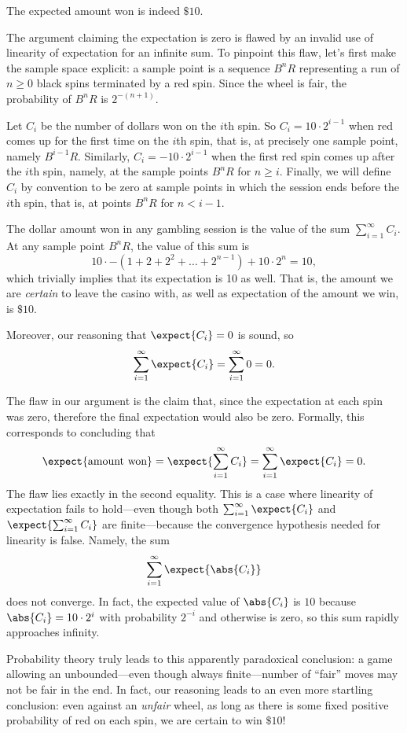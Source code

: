 \begin{editingnotes}
The expected amount won is indeed $\$10$.

The argument claiming the expectation is zero is flawed by an invalid use
of linearity of expectation for an infinite sum.  To pinpoint this flaw,
let's first make the sample space explicit: a sample point is a sequence
$B^nR$ representing a run of $n \geq 0$ black spins terminated by a red
spin.  Since the wheel is fair, the probability of $B^nR$ is $2^{-(n+1)}$.

Let $C_i$ be the number of dollars won on the $i$th spin.  So
$C_i = 10 \cdot 2^{i-1}$
when red comes up for the first time on the $i$th spin, that is, at
precisely one sample point, namely $B^{i-1}R$.  Similarly,
$C_i = -10  \cdot  2^{i-1}$
when the first red spin comes up after the $i$th spin, namely, at the
sample points $B^nR$ for $n \geq i$.  Finally, we will define $C_i$ by
convention to be zero at sample points in which the session ends before the
$i$th spin, that is, at points $B^nR$ for $n < i-1$.

The dollar amount won in any gambling session is the value of the sum
$\sum_{i = 1}^\infty C_i$.  At any sample point $B^nR$, the value of this
sum is
\[
10 \cdot -(1 + 2 + 2^2 + \dots + 2^{n - 1}) + 10 \cdot 2^n  = 10,
\]
which trivially implies that its expectation is 10 as well.  That is, the
amount we are \emph{certain} to leave the casino with, as well as
expectation of the amount we win, is $\$10$.

Moreover, our reasoning that $\expect{C_i} = 0$ is sound, so
\[
\sum_{i = 1}^\infty \expect{C_i} = \sum_{i = 1}^\infty 0 = 0.
\]

The flaw in our argument is the claim that, since the expectation at each
spin was zero, therefore the final expectation would also be zero.
Formally, this corresponds to concluding that
\[
\expect{\mbox{amount won}}  =  \expect{\sum_{i = 1}^\infty C_i}
  =  \sum_{i = 1}^\infty \expect{C_i} = 0.
\]
The flaw lies exactly in the second equality.  This is a case where
linearity of expectation fails to hold---even though both $\sum_{i =
1}^\infty \expect{C_i}$ and $\expect{\sum_{i = 1}^\infty C_i}$ are
finite---because the convergence hypothesis needed for linearity is false.
Namely, the sum
\[
\sum_{i = 1}^\infty \expect{\abs{C_i}}
\]
does not converge.  In fact, the expected value of $\abs{C_i}$ is $10$
because $\abs{C_i} =  10 \cdot 2^{i}$  with probability $2^{-i}$ and
otherwise is zero, so this sum rapidly approaches infinity.

Probability theory truly leads to this apparently paradoxical conclusion: a
game allowing an unbounded---even though always finite---number of ``fair''
moves may not be fair in the end.  In fact, our reasoning leads to an even
more startling conclusion: even against an \emph{unfair} wheel, as long as
there is some fixed positive probability of red on each spin, we are
certain to win $\$10$!


\end{editingnotes}
